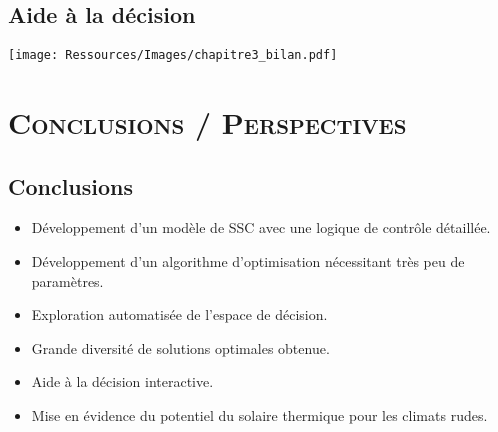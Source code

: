 \documentclass[xcolor=x11names, compress, 11pt]{beamer}
\begin{document}
\subsection{Aide à la décision}
\begin{frame}[t]
    \vfill
    \centering
    \texttt{[image: Ressources/Images/chapitre3\_bilan.pdf]}
    \vfill
\end{frame}


\begin{frame}[c]
    \vfill
    \centering
    \vfill
\end{frame}














\section{\scshape Conclusions / Perspectives}


\subsection{Conclusions}
\begin{frame}[c]
    \vfill
    \begin{itemize}
        \item Développement d’un modèle de SSC avec une logique de contrôle détaillée.
        \vfill
        \item Développement d’un algorithme d’optimisation nécessitant très peu de paramètres.
        \vfill
        \item Exploration automatisée de l’espace de décision.
        \vfill
        \item Grande diversité de solutions optimales obtenue.
        \vfill
        \item Aide à la décision interactive.
        \vfill
        \item Mise en évidence du potentiel du solaire thermique pour les climats rudes.
    \end{itemize}
    \vfill
\end{frame}
\end{document}
